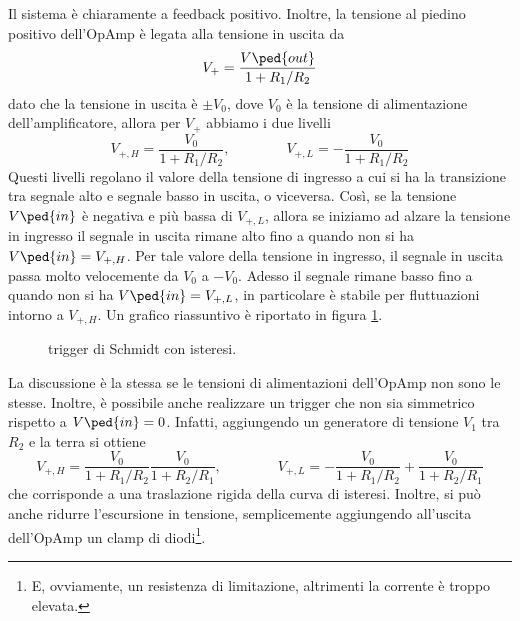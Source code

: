 \documentclass[a4paper, 11pt]{article}
\begin{document}
	Il sistema è chiaramente a feedback positivo. Inoltre, la tensione al piedino positivo dell'OpAmp è legata alla tensione in uscita da
	\[V_+=\frac{V\ped{out}}{1+R_1/R_2}\]
	dato che la tensione in uscita è $\pm V_0$, dove $V_0$ è la tensione di alimentazione dell'amplificatore, allora per $V_+$ abbiamo i due livelli
	\[V_{+,H}=\frac{V_0}{1+R_1/R_2},\qquad\qquad V_{+,L}=-\frac{V_0}{1+R_1/R_2}\]
	Questi livelli regolano il valore della tensione di ingresso a cui si ha la transizione tra segnale alto e segnale basso in uscita, o viceversa. Così, se la tensione $V\ped{in}$ è negativa e più bassa di $V_{+,L}$, allora se iniziamo ad alzare la tensione in ingresso il segnale in uscita rimane alto fino a quando non si ha $V\ped{in}=V_{+,H}$. Per tale valore della tensione in ingresso, il segnale in uscita passa molto velocemente da $V_0$ a $-V_0$. Adesso il segnale rimane basso fino a quando non si ha $V\ped{in}=V_{+,L}$, in particolare è stabile per fluttuazioni intorno a $V_{+,H}$. Un grafico riassuntivo è riportato in figura \ref{fig:schmidt}.
	\begin{figure}[h!]
		\centering
		\caption{trigger di Schmidt con isteresi.}
		\label{fig:schmidt}
	\end{figure}
	La discussione è la stessa se le tensioni di alimentazioni dell'OpAmp non sono le stesse. Inoltre, è possibile anche realizzare un trigger che non sia simmetrico rispetto a $V\ped{in}=0$. Infatti, aggiungendo un generatore di tensione $V_1$ tra $R_2$ e la terra si ottiene
	\[V_{+,H}=\frac{V_0}{1+R_1/R_2}\frac{V_0}{1+R_2/R_1},\qquad\qquad V_{+,L}=-\frac{V_0}{1+R_1/R_2}+\frac{V_0}{1+R_2/R_1}\]
	che corrisponde a una traslazione rigida della curva di isteresi. Inoltre, si può anche ridurre l'escursione in tensione, semplicemente aggiungendo all'uscita dell'OpAmp un clamp di diodi\footnote{E, ovviamente, un resistenza di limitazione, altrimenti la corrente è troppo elevata.}.
\end{document}
